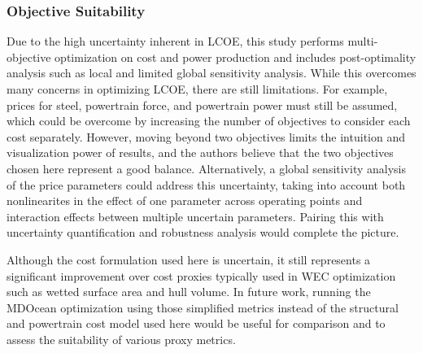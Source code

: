\subsubsection{Objective Suitability}
Due to the high uncertainty inherent in LCOE, this study performs multi-objective optimization on cost and power production and includes post-optimality analysis such as local and limited global sensitivity analysis. While this overcomes many concerns in optimizing LCOE, there are still limitations. For example, prices for steel, powertrain force, and powertrain power must still be assumed, which could be overcome by increasing the number of objectives to consider each cost separately. However, moving beyond two objectives limits the intuition and visualization power of results, and the authors believe that the two objectives chosen here represent a good balance. Alternatively, a global sensitivity analysis of the price parameters could address this uncertainty, taking into account both nonlinearites in the effect of one parameter across operating points and interaction effects between multiple uncertain parameters. Pairing this with uncertainty quantification and robustness analysis would complete the picture.

Although the cost formulation used here is uncertain, it still represents a significant improvement over cost proxies typically used in WEC optimization such as wetted surface area and hull volume. In future work, running the MDOcean optimization using those simplified metrics instead of the structural and powertrain cost model used here would be useful for comparison and to assess the suitability of various proxy metrics. 




